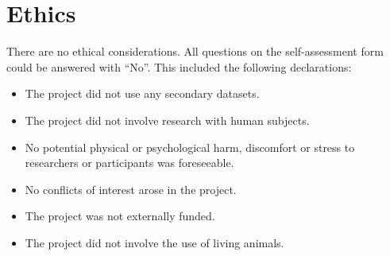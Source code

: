 \chapter{Ethics}
There are no ethical considerations. All questions on the self-assessment form could be answered with ``No''. This included the following declarations:
\begin{itemize}
    \item The project did not use any secondary datasets.
    \item The project did not involve research with human subjects.
    \item No potential physical or psychological harm, discomfort or stress to researchers or participants was foreseeable.
    \item No conflicts of interest arose in the project.
    \item The project was not externally funded.
    \item The project did not involve the use of living animals.
\end{itemize}